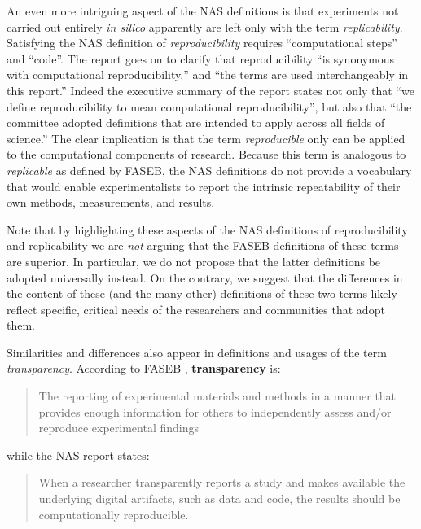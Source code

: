 An even more intriguing aspect of the NAS definitions \cite{committeeonreproducibilityandreplicabilityinscience2019reproducibility}
	is that experiments not carried out
	entirely \emph{in silico} apparently are left only with the term \emph{replicability}.
Satisfying the NAS definition of \emph{reproducibility} requires
	``computational steps'' and ``code''.  The report goes on to clarify
	that reproducibility ``is synonymous with computational reproducibility,''  and ``the terms are used interchangeably in this report.''
Indeed the executive summary of the report states not only that ``we define reproducibility to mean computational reproducibility'',
	but also that ``the committee adopted definitions that are intended to apply across all fields of science.''
The clear implication is that the term \emph{reproducible} only can be applied to the computational components of research.
Because this term is analogous to \emph{replicable} as defined by FASEB, the NAS definitions do not provide a vocabulary
	that would enable experimentalists to report the intrinsic repeatability of their own methods, measurements, and results.

Note that by highlighting these aspects of the NAS definitions
	of reproducibility and replicability we are \emph{not} arguing
 	that the FASEB definitions of these terms are superior.
In particular, we do not propose that the latter definitions be adopted universally instead.
On the contrary, we suggest that the differences in the content of these (and the many other) definitions
of these two terms likely reflect specific, critical needs of the researchers and communities that adopt them.

Similarities and differences also appear in definitions and usages of the term \emph{transparency}.
According to FASEB \cite{FASEB2016enhancing}, \textbf{transparency} is:
\begin{quote}
	The reporting of experimental materials and methods in a manner that provides enough information
	for others to independently assess and/or reproduce experimental findings
      \end{quote}
while the NAS report \cite{committeeonreproducibilityandreplicabilityinscience2019reproducibility} states:
 \begin{quote}
	When a researcher transparently reports a study and makes available the underlying digital artifacts, such as data and code,
	the results should be computationally reproducible.
      \end{quote}

